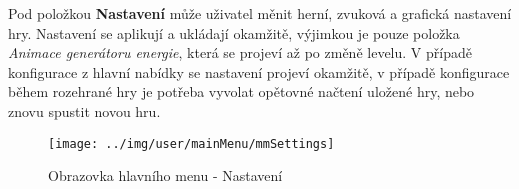Pod položkou \textbf{Nastavení} může uživatel měnit herní, zvuková a grafická nastavení hry. Nastavení se aplikují a ukládají okamžitě, výjimkou je pouze položka \textit{Animace generátoru energie}, která se projeví až po změně levelu. V případě konfigurace z hlavní nabídky se nastavení projeví okamžitě, v případě konfigurace během rozehrané hry je potřeba vyvolat opětovné načtení uložené hry, nebo znovu spustit novou hru.

\begin{figure}[!ht]\centering
\texttt{[image: ../img/user/mainMenu/mmSettings]}

\caption{Obrazovka hlavního menu - Nastavení}
\label{fig:user_mainMenu_mmSettings}

\end{figure}

\FloatBarrier